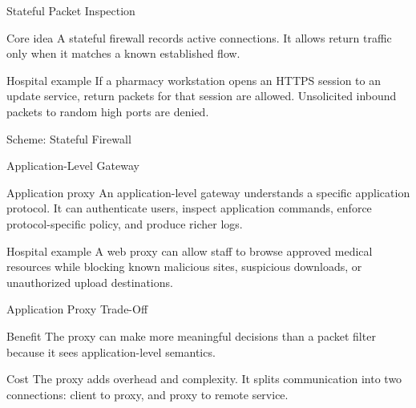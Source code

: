 \documentclass[presentation]{beamer}
\begin{document}
\begin{frame}[c]{Stateful Packet Inspection}
\begin{block}{Core idea}
A stateful firewall records active connections. It allows return traffic only when it matches a
known established flow.
\end{block}

\begin{exampleblock}{Hospital example}
If a pharmacy workstation opens an HTTPS session to an update service, return packets for that
session are allowed. Unsolicited inbound packets to random high ports are denied.
\end{exampleblock}
\end{frame}

\begin{frame}[c]{Scheme: Stateful Firewall}
\begin{center}
\end{center}
\end{frame}

\begin{frame}[c]{Application-Level Gateway}
\begin{block}{Application proxy}
An application-level gateway understands a specific application protocol. It can authenticate users,
inspect application commands, enforce protocol-specific policy, and produce richer logs.
\end{block}

\begin{exampleblock}{Hospital example}
A web proxy can allow staff to browse approved medical resources while blocking known malicious
sites, suspicious downloads, or unauthorized upload destinations.
\end{exampleblock}
\end{frame}

\begin{frame}[c]{Application Proxy Trade-Off}
\begin{block}{Benefit}
The proxy can make more meaningful decisions than a packet filter because it sees application-level
semantics.
\end{block}

\begin{block}{Cost}
The proxy adds overhead and complexity. It splits communication into two connections: client to
proxy, and proxy to remote service.
\end{block}
\end{frame}
\end{document}
